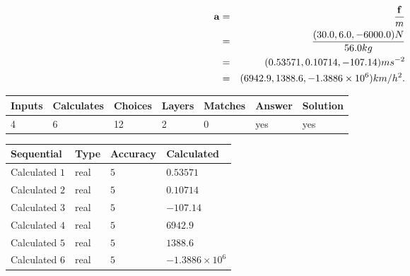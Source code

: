 \documentclass[12pt]{article}
\begin{document}
\begin{eqnarray*}
\mathbf{a}&=&\frac{\mathbf{f}}m  \\
&=&\frac{(
30.0 ,
6.0 ,
-6000.0 )N
}{ %
56.0 kg}  \\
&=&(
0.53571 ,
0.10714,
-107.14
)ms^{-2} \\
&=&(
6942.9 ,
1388.6 ,
-1.3886 \times 10^{6}
)km/h^2.
\end{eqnarray*}
 
 
 
\noindent{}
 
 

 
 
\vspace{0.3in}
   
   
   
   
\noindent\begin{tabular}{|l|l|l|l|l|l|l|}
 \hline
Inputs & Calculates & Choices & Layers & Matches & Answer & Solution \\ \hline
           4  & 
           6  & 
          12
  & 
           2  & 
           0  & 
  yes & 
  yes 
  \\ \hline
 \end{tabular}
   
   
   
   
\noindent{}
   
   
  
  
\noindent\begin{tabular}{|l|l|l|l|}
\hline
 Sequential & Type & Accuracy & Calculated \\ 
\hline
 
 
  Calculated $            1 $ & real & $            5  $ & 
 $ 0.53571 $ 
 \\  \hline  
 
 
  Calculated $            2 $ & real & $            5  $ & 
 $ 0.10714 $ 
 \\  \hline  
 
 
  Calculated $            3 $ & real & $            5  $ & 
 $ -107.14 $ 
 \\  \hline  
 
 
  Calculated $            4 $ & real & $            5  $ & 
 $ 6942.9 $ 
 \\  \hline  
 
 
  Calculated $            5 $ & real & $            5  $ & 
 $ 1388.6 $ 
 \\  \hline  
 
 
  Calculated $            6 $ & real & $            5  $ & 
 $ -1.3886 \times 10^{6} $ 
 \\  \hline  
 \end{tabular}
   
\end{document}
